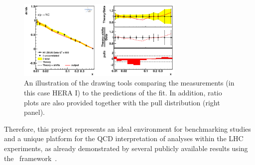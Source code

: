 \begin{description}
\begin{figure}[!ht]
   \centering
   \includegraphics[width=8cm]{datatheory.pdf}
   \caption{An illustration of the \fitter drawing tools comparing the measurements (in this case HERA I) to the predictions of the fit. In addition, ratio plots are also provided together with the pull distribution (right panel).} 
 \label{fig:data}
\end{figure}

\end{description}
%


Therefore, this project represents 
an ideal environment for benchmarking studies and a unique platform for the QCD interpretation of analyses within the LHC experiments,
as already demonstrated by several publicly available results using the \fitter\ 
framework~\cite{atlas:strange,atlas:jets,atlas:hm,cms:strange,cms:jets,h1:2012kk,h1zeus:charm}.  

